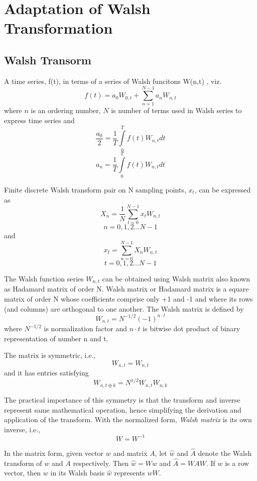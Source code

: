 \chapter{Adaptation of Walsh Transformation} \label{ch:walsh transformation}

\section{Walsh Transorm}
A time series, f(t), in terms of a series of Walsh funcitons W(n,t) \cite{Beauchamp1975}, viz.
\[
f(t) = a_{0} W_{0,t} + \sum_{n=1}^{N-1} a_n W_{n,t}
\]
where $n$ is an ordering number, $N$ is number of terms used in Walsh series to express time series and
\[
\frac{a_0}{2} = \frac{1}{T} \int\limits_0^T f(t) W_{n,t} dt
\]
\[
a_n = \frac{1}{T} \int\limits_0^T f(t) W_{n,t} dt
\]

Finite discrete Walsh transform pair on N sampling points, $x_t$, can be expressed as \cite{Beauchamp1975} 
\begin{equation}
\label{WalshT}
X_n = \frac{1}{N} \sum_{t=0}^{N-1} x_t W_{n,t}
\end{equation}
\[
n = 0, 1, 2...N-1
\]
and
\[
x_t = \sum_{n=0}^{N-1} X_n W_{n,t}
\]
\[
t = 0, 1, 2...N-1
\]

The Walsh function series $W_{n,t}$ can be obtained using Walsh matrix also known as Hadamard matrix of order N. 
Walsh matrix or Hadamard matrix is a square matrix of order N whose coefficients comprise only +1 and -1 and where its rows 
(and columns) are orthogonal to one another. 
The Walsh matrix is defined by
\[
W_{n,t} = N^{-1/2} (-1)^{n \cdot t}
\]
where $N^{-1/2}$ is normalization factor and $n \cdot t$ is bitwise dot product of binary representation of number n and t.

The matrix is symmetric, i.e.,
\[
W_{n,t} = W_{n,t}
\]
and it has entries satisfying
\[
W_{n, t \oplus k} = N^{1/2} W_{n, t} W_{n, k}
\]

The practical importance of this symmetry is that the transform and inverse represent same mathematical operation, hence simplifying the derivation and application of the transform. With the normalized form, \textit{Walsh matrix} is its own inverse, i.e.,
\[
W = W^{-1}
\]

In the matrix form, given vector $w$ and matrix $A$, let $\widehat{w}$ and
$\widehat{A}$ denote the Walsh transform of $w$ and $A$ respectively. Then $\widehat{w} = Ww$ and
$\widehat{A} = WAW$. If $w$ is a row vector, then $w$ in its Walsh basis $\widehat{w}$ represents $wW$.

